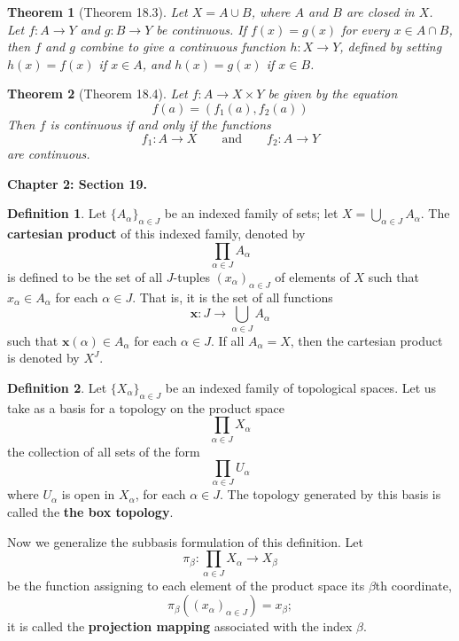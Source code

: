 \documentclass{article}
\newtheorem{theorem}{Theorem}
\theoremstyle{definition}
\newtheorem{definition}{Definition}[section]
\theoremstyle{remark}
\begin{document}
    \begin{theorem}[Theorem 18.3]
        Let $X = A\cup B$, where $A$ and $B$ are closed in $X$. Let $f: A\to Y$ and $g: B\to Y$ be continuous. If $f(x) = g(x)$
        for every $x\in A\cap B$, then $f$ and $g$ combine to give a continuous function $h: X\to Y$, defined by setting
        $h(x) = f(x)$ if $x\in A$, and $h(x) = g(x)$ if $x\in B$.
    \end{theorem}

    \begin{theorem}[Theorem 18.4]
        Let $f: A\to X\times Y$ be given by the equation
        \[ f(a) = (f_1(a),f_2(a)) \]
        Then $f$ is continuous if and only if the functions
        \[ f_1:A\to X\qquad\text{and}\qquad f_2: A\to Y \]
        are continuous.
    \end{theorem}

    \newpage

    \textbf{Chapter 2: Section 19.}
    \begin{definition}
        Let $\{A_{\alpha}\}_{\alpha\in J}$ be an indexed family of sets; let $X = \bigcup_{\alpha\in J} A_{\alpha}$. The
        \textbf{cartesian product} of this indexed family, denoted by
        \[ \prod_{\alpha\in J} A_{\alpha} \]
        is defined to be the set of all $J$-tuples $(x_{\alpha})_{\alpha\in J}$ of elements of $X$ such that $x_{\alpha}\in A_{\alpha}$
        for each $\alpha\in J$. That is, it is the set of all functions
        \[ \mathbf{x}: J \to \bigcup_{\alpha\in J} A_{\alpha} \]
        such that $\mathbf{x}(\alpha)\in A_{\alpha}$ for each $\alpha\in J$. If all $A_{\alpha} = X$, then the cartesian product
        is denoted by $X^J$.
    \end{definition}

    \begin{definition}
        Let $\{X_{\alpha}\}_{\alpha\in J}$ be an indexed family of topological spaces. Let us take as a basis for a topology on the
        product space
        \[ \prod_{\alpha\in J} X_{\alpha} \]
        the collection of all sets of the form
        \[ \prod_{\alpha\in J} U_{\alpha} \]
        where $U_{\alpha}$ is open in $X_{\alpha}$, for each $\alpha\in J$. The topology generated by this basis is called the
        \textbf{the box topology}.
    \end{definition}

    Now we generalize the subbasis formulation of this definition. Let
    \[ \pi_{\beta}: \prod_{\alpha\in J} X_{\alpha} \to X_{\beta} \]
    be the function assigning to each element of the product space its $\beta$th coordinate,
    \[ \pi_{\beta}((x_{\alpha})_{\alpha\in J}) = x_{\beta}; \]
    it is called the \textbf{projection mapping} associated with the index $\beta$.
\end{document}
